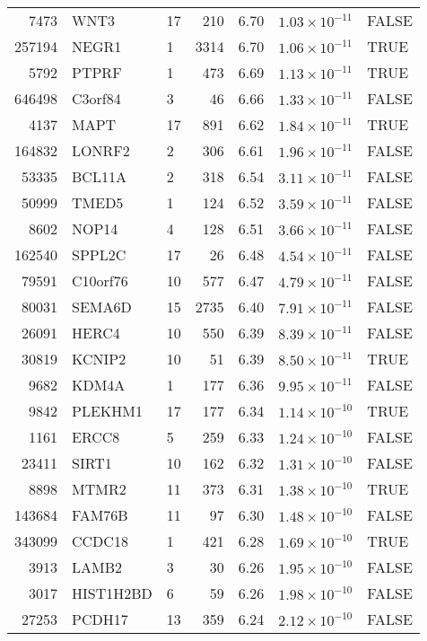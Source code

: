 \begin{table}[ht]
\begin{adjustbox}{totalheight=10in}
\begin{tabular}{rllrrrl}
  7473 & WNT3 & 17 & 210 & 6.70 & $1.03 \times 10^{-11}$ & FALSE \\ 
  257194 & NEGR1 & 1 & 3314 & 6.70 & $1.06 \times 10^{-11}$ & TRUE \\ 
  5792 & PTPRF & 1 & 473 & 6.69 & $1.13 \times 10^{-11}$ & TRUE \\ 
  646498 & C3orf84 & 3 &  46 & 6.66 & $1.33 \times 10^{-11}$ & FALSE \\ 
  4137 & MAPT & 17 & 891 & 6.62 & $1.84 \times 10^{-11}$ & TRUE \\ 
  164832 & LONRF2 & 2 & 306 & 6.61 & $1.96 \times 10^{-11}$ & FALSE \\ 
  53335 & BCL11A & 2 & 318 & 6.54 & $3.11 \times 10^{-11}$ & FALSE \\ 
  50999 & TMED5 & 1 & 124 & 6.52 & $3.59 \times 10^{-11}$ & FALSE \\ 
  8602 & NOP14 & 4 & 128 & 6.51 & $3.66 \times 10^{-11}$ & FALSE \\ 
  162540 & SPPL2C & 17 &  26 & 6.48 & $4.54 \times 10^{-11}$ & FALSE \\ 
  79591 & C10orf76 & 10 & 577 & 6.47 & $4.79 \times 10^{-11}$ & FALSE \\ 
  80031 & SEMA6D & 15 & 2735 & 6.40 & $7.91 \times 10^{-11}$ & FALSE \\ 
  26091 & HERC4 & 10 & 550 & 6.39 & $8.39 \times 10^{-11}$ & FALSE \\ 
  30819 & KCNIP2 & 10 &  51 & 6.39 & $8.50 \times 10^{-11}$ & TRUE \\ 
  9682 & KDM4A & 1 & 177 & 6.36 & $9.95 \times 10^{-11}$ & FALSE \\ 
  9842 & PLEKHM1 & 17 & 177 & 6.34 & $1.14 \times 10^{-10}$ & TRUE \\ 
  1161 & ERCC8 & 5 & 259 & 6.33 & $1.24 \times 10^{-10}$ & FALSE \\ 
  23411 & SIRT1 & 10 & 162 & 6.32 & $1.31 \times 10^{-10}$ & FALSE \\ 
  8898 & MTMR2 & 11 & 373 & 6.31 & $1.38 \times 10^{-10}$ & TRUE \\ 
  143684 & FAM76B & 11 &  97 & 6.30 & $1.48 \times 10^{-10}$ & FALSE \\ 
  343099 & CCDC18 & 1 & 421 & 6.28 & $1.69 \times 10^{-10}$ & TRUE \\ 
  3913 & LAMB2 & 3 &  30 & 6.26 & $1.95 \times 10^{-10}$ & FALSE \\ 
  3017 & HIST1H2BD & 6 &  59 & 6.26 & $1.98 \times 10^{-10}$ & FALSE \\ 
  27253 & PCDH17 & 13 & 359 & 6.24 & $2.12 \times 10^{-10}$ & FALSE \\ 

\end{tabular}
\end{adjustbox}
\end{table}
